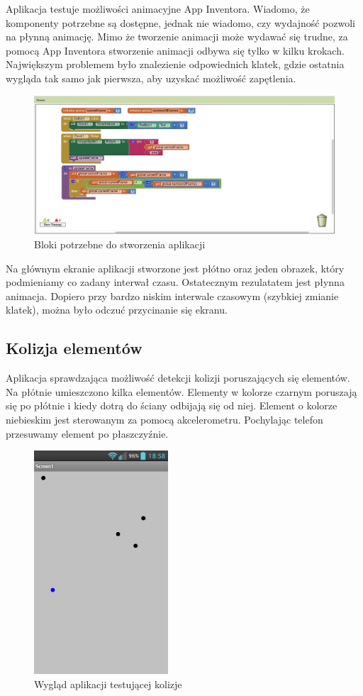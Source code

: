 Aplikacja testuje możliwości animacyjne App Inventora. Wiadomo, że komponenty potrzebne są dostępne, jednak nie wiadomo, czy wydajność pozwoli na płynną animację. Mimo że tworzenie animacji może wydawać się trudne, za pomocą App Inventora stworzenie animacji odbywa się tylko w kilku krokach. Największym problemem było znalezienie odpowiednich klatek, gdzie ostatnia wygląda tak samo jak pierwsza, aby uzyskać możliwość zapętlenia.


\begin{figure}[H]
\centering\includegraphics[width=15cm]{figures/apps/ai_animation}
\caption{Bloki potrzebne do stworzenia aplikacji}
\end{figure}

Na głównym ekranie aplikacji stworzone jest płótno oraz jeden obrazek, który podmieniamy co zadany interwał czasu. Ostatecznym rezulatatem jest płynna animacja. Dopiero przy bardzo niskim interwale czasowym (szybkiej zmianie klatek), można było odczuć przycinanie się ekranu.


\subsection{Kolizja elementów}

Aplikacja sprawdzająca możliwość detekcji kolizji poruszających się elementów. Na płótnie umieszczono kilka elementów. Elementy w kolorze czarnym poruszają się po płótnie i kiedy dotrą do ściany odbijają się od niej. Element o kolorze niebieskim jest sterowanym za pomocą akcelerometru. Pochylając telefon przesuwamy element po płaszczyźnie.

\begin{figure}[H]
\centering\includegraphics[width=5cm]{figures/apps/ai_collision}
\caption{Wygląd aplikacji testującej kolizje}
\end{figure}

